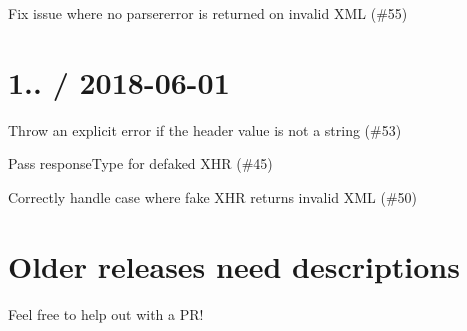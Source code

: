 
\begin{DoxyItemize}
\item Fix issue where no parsererror is returned on invalid X\+ML (\#55)
\end{DoxyItemize}

\section*{1.. / 2018-\/06-\/01 }


\begin{DoxyItemize}
\item Throw an explicit error if the header value is not a string (\#53)
\item Pass response\+Type for defaked X\+HR (\#45)
\item Correctly handle case where fake X\+HR returns invalid X\+ML (\#50)
\end{DoxyItemize}

\section*{Older releases need descriptions }

Feel free to help out with a P\+R! 